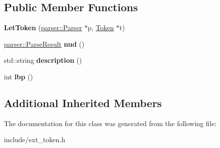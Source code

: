 \subsection*{Public Member Functions}
\begin{DoxyCompactItemize}
\item 
{\bfseries Let\+Token} (\hyperlink{classfcal_1_1parser_1_1Parser}{parser\+::\+Parser} $\ast$p, \hyperlink{classfcal_1_1scanner_1_1Token}{Token} $\ast$t)\hypertarget{classfcal_1_1scanner_1_1LetToken_ad9897630e641c116602af17066086bf0}{}\label{classfcal_1_1scanner_1_1LetToken_ad9897630e641c116602af17066086bf0}

\item 
\hyperlink{classfcal_1_1parser_1_1ParseResult}{parser\+::\+Parse\+Result} {\bfseries nud} ()\hypertarget{classfcal_1_1scanner_1_1LetToken_a020d102d24a3bda7bddec7e6ccbb7f01}{}\label{classfcal_1_1scanner_1_1LetToken_a020d102d24a3bda7bddec7e6ccbb7f01}

\item 
std\+::string {\bfseries description} ()\hypertarget{classfcal_1_1scanner_1_1LetToken_aabb7ae69eea2ce5e179c26a72a479aa9}{}\label{classfcal_1_1scanner_1_1LetToken_aabb7ae69eea2ce5e179c26a72a479aa9}

\item 
int {\bfseries lbp} ()\hypertarget{classfcal_1_1scanner_1_1LetToken_abefbfa2c420b3e1214b85849d0db2e43}{}\label{classfcal_1_1scanner_1_1LetToken_abefbfa2c420b3e1214b85849d0db2e43}

\end{DoxyCompactItemize}
\subsection*{Additional Inherited Members}


The documentation for this class was generated from the following file\+:\begin{DoxyCompactItemize}
\item 
include/ext\+\_\+token.\+h\end{DoxyCompactItemize}
